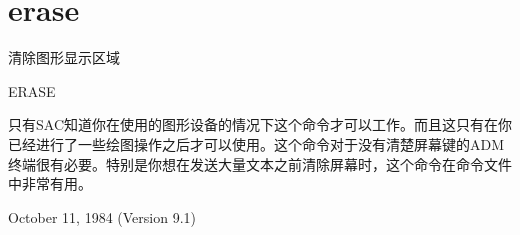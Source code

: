 \section{erase}
\label{cmd:erase}

清除图形显示区域

ERASE

只有SAC知道你在使用的图形设备的情况下这个命令才可以工作。而且这只有在你已经进行了一些绘图操作之后才可以使用。这个命令对于没有清楚屏幕键的ADM终端很有必要。特别是你想在发送大量文本之前清除屏幕时，这个命令在命令文件中非常有用。

October 11, 1984 (Version 9.1)

